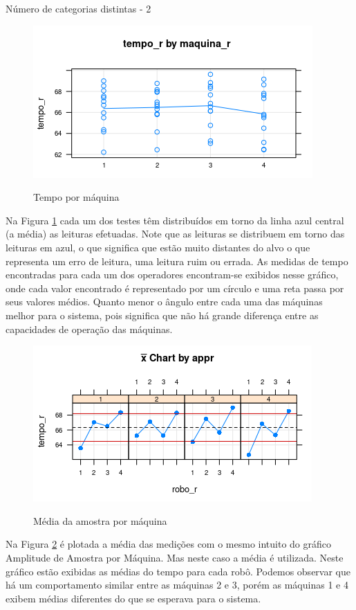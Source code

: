 \documentclass[
12pt,					%
openright,				%
oneside,				%
a4paper,				%
english,
brazil
]{ABNT/abntex2_report}
\begin{document}
Número de categorias distintas - 2

\begin{figure}[H]
	\centering
	\caption{Tempo por máquina}
	\includegraphics[scale = 1]{figures/graf4.png}
	\label{fig:graf4}
\end{figure}

Na Figura \ref{fig:graf4} cada um dos testes têm distribuídos em torno da linha azul central (a média) as leituras efetuadas. Note que as leituras se distribuem em torno das leituras em azul, o que significa que estão muito distantes do alvo o que representa um erro de leitura, uma leitura ruim ou errada. As medidas de tempo encontradas para cada um dos operadores encontram-se exibidos nesse gráfico, onde cada valor encontrado é representado por um círculo e uma reta passa por seus valores médios. Quanto menor o ângulo entre cada uma das máquinas melhor para o sistema, pois significa que não há grande diferença entre as capacidades de operação das máquinas.

\begin{figure}[H]
	\centering
	\caption{Média da amostra por máquina}
	\includegraphics[scale = 1]{figures/graf5.png}
	\label{fig:graf5}
\end{figure}

Na Figura \ref{fig:graf5} é plotada a média das medições com o mesmo intuito do gráfico Amplitude de Amostra por Máquina. Mas neste caso a média é utilizada. Neste gráfico estão exibidas as médias do tempo para cada robô. Podemos observar que há um comportamento similar entre as máquinas 2 e 3, porém as máquinas 1 e 4 exibem médias diferentes do que se esperava para o
sistema.
\end{document}

